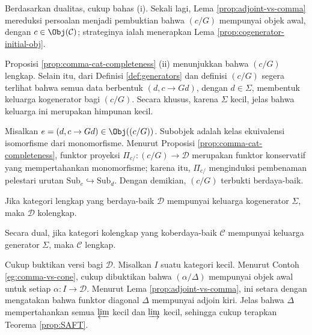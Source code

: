 \begin{bukti}
	Berdasarkan dualitas, cukup bahas (i). Sekali lagi, Lema
	\ref{prop:adjoint-vs-comma} mereduksi persoalan menjadi pembuktian bahwa
	$(c/G)$ mempunyai objek awal, dengan $c\in\Obj(\mathcal{C})$; strateginya
	ialah menerapkan Lema \ref{prop:cogenerator-initial-obj}.

	Proposisi \ref{prop:comma-cat-completeness} (ii) menunjukkan bahwa $(c/G)$
	lengkap. Selain itu, dari Definisi \ref{def:generators} dan definisi
	$(c/G)$ segera terlihat bahwa semua data berbentuk $(d,c\to Gd)$, dengan
	$d\in\Sigma$, membentuk keluarga kogenerator bagi $(c/G)$. Secara khusus,
	karena $\Sigma$ kecil, jelas bahwa keluarga ini merupakan himpunan kecil.

	Misalkan $e=(d,c\to Gd)\in\Obj((c/G))$. Subobjek adalah kelas ekuivalensi
	isomorfisme dari monomorfisme. Menurut Proposisi
	\ref{prop:comma-cat-completeness}, funktor proyeksi
	$\Pi_{c/}:(c/G)\to\mathcal{D}$ merupakan funktor konservatif yang
	mempertahankan monomorfisme; karena itu, $\Pi_{c/}$ menginduksi pembenaman
	pelestari urutan $\mathrm{Sub}_e\hookrightarrow\mathrm{Sub}_d$. Dengan
	demikian, $(c/G)$ terbukti berdaya-baik.
\end{bukti}

\begin{korolari}\label{prop:SAFT-completeness}
	Jika kategori lengkap yang berdaya-baik $\mathcal{D}$ mempunyai keluarga
	kogenerator $\Sigma$, maka $\mathcal{D}$ kolengkap.

	Secara dual, jika kategori kolengkap yang koberdaya-baik $\mathcal{C}$
	mempunyai keluarga generator $\Sigma$, maka $\mathcal{C}$ lengkap.
\end{korolari}
\begin{bukti}
	Cukup buktikan versi bagi $\mathcal{D}$. Misalkan $I$ suatu kategori kecil.
	Menurut Contoh \ref{eg:comma-vs-cone}, cukup dibuktikan bahwa
	$(\alpha/\Delta)$ mempunyai objek awal untuk setiap
	$\alpha:I\to\mathcal{D}$. Menurut Lema
	\ref{prop:adjoint-vs-comma}, ini setara dengan mengatakan bahwa funktor
	diagonal $\Delta$ mempunyai adjoin kiri. Jelas bahwa $\Delta$
	mempertahankan semua $\varprojlim$ kecil dan $\varinjlim$ kecil, sehingga
	cukup terapkan Teorema \ref{prop:SAFT}.
\end{bukti}

